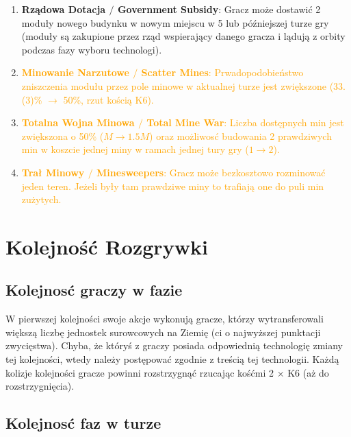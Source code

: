 \documentclass[11pt,a4paper]{article}
\begin{document}
\begin{enumerate}
\item \textbf{Rządowa Dotacja $/$ Government Subsidy}: Gracz może dostawić 2 moduły nowego budynku w nowym miejscu w 5 lub późniejszej turze gry (moduły są zakupione przez rząd wspierający danego gracza i lądują z orbity podczas fazy wyboru technologi).
\item \textcolor{orange}{\textbf{Minowanie Narzutowe $/$ Scatter Mines}: Prwadopodobieństwo zniszczenia modułu przez pole minowe w aktualnej turze jest zwiększone (33.(3)\% $\to$ 50\%, rzut kością K6).}  
\item \textcolor{orange}{\textbf{Totalna Wojna Minowa $/$ Total Mine War}: Liczba dostępnych min jest zwiększona o 50\% ($M \to 1.5 M$) oraz możliwosć budowania 2 prawdziwych min w koszcie jednej miny w ramach jednej tury gry ($1 \to 2$).}
\item \textcolor{orange}{\textbf{Trał Minowy $/$ Minesweepers}: Gracz może bezkosztowo rozminować jeden teren. Jeżeli były tam prawdziwe miny to trafiają one do puli min zużytych.}
  
\end{enumerate}

\newpage
\section{Kolejność Rozgrywki}

\subsection{Kolejnosć graczy w fazie}

W pierwszej kolejności swoje akcje wykonują gracze, którzy wytransferowali większą liczbę jednostek surowcowych na Ziemię (ci o najwyższej punktacji zwycięstwa). Chyba, że któryś z graczy posiada odpowiednią technologię zmiany tej kolejności, wtedy należy postępować zgodnie z treścią tej technologii. Każdą kolizje kolejności gracze powinni rozstrzygnąć rzucając kośćmi 2 $\times$ K6 (aż do rozstrzygnięcia).

\subsection{Kolejnosć faz w turze}
\end{document}
